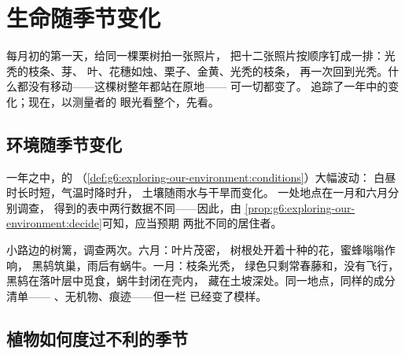 \chapter{生命随季节变化}\label{ch:g6:life-through-seasons}

每月初的第一天，给同一棵栗树拍一张照片，
把十二张照片按顺序钉成一排：光秃的枝条、芽、
叶、花穗如烛、栗子、金黄、光秃的枝条，
再一次回到光秃。什么都没有移动——这棵树整年都站在原地——
可一切都变了。
追踪了一年中的变化；现在，以测量者的
眼光看整个，先看。

\section{环境随季节变化}

\begin{proposition}[条件的季节性变化]\label{prop:g6:life-through-seasons:conditions}
一年之中，的
（\cref{def:g6:exploring-our-environment:conditions}）大幅波动：
白昼时长时短，气温时降时升，
土壤随雨水与干旱而变化。
一处地点在一月和六月分别调查，
得到的表中两行数据不同——因此，由
\cref{prop:g6:exploring-our-environment:decide}可知，应当预期
两批不同的居住者。
\end{proposition}
\admitted

\begin{example}\label{ex:g6:life-through-seasons:hedge}
小路边的树篱，调查两次。六月：叶片茂密，
树根处开着十种的花，蜜蜂嗡嗡作响，
黑鸫筑巢，雨后有蜗牛。一月：枝条光秃，
绿色只剩常春藤和，没有飞行，
黑鸫在落叶层中觅食，蜗牛封闭在壳内，
藏在土坡深处。同一地点，同样的成分清单——
、无机物、痕迹——但一栏
已经变了模样。
\end{example}

\section{植物如何度过不利的季节}

